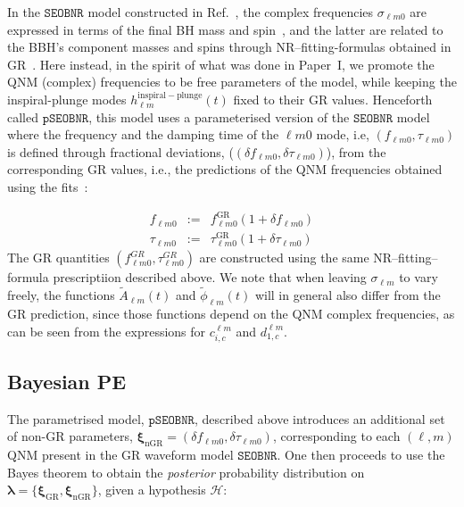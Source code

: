 \documentclass[twocolumn,prd,superscriptaddress,amsfonts,amssymb,amsmath,preprintnumbers]{revtex4-1}
\newcommand{\paperone}{Paper~I\xspace}
\newcommand{\blambda}{\bm{\lambda}}
\newcommand{\bxigr}{\bm{\xi}_{\text{GR}}}
\newcommand{\bxingr}{\bm{\xi}_{\text{nGR}}}
\newcommand{\pSEOB}{\texttt{pSEOBNR}}
\newcommand{\SEOB}{\texttt{SEOBNR}}
\begin{document}
In the $\SEOB$ model constructed in Ref.~\cite{Cotesta:2018fcv}, the complex frequencies $\sigma_{\ell m 0}$  are expressed in terms of the final BH mass and spin~\cite{Berti:2005ys,Berti:2009kk}, and the latter are related to the BBH's component masses and spins through NR--fitting-formulas obtained in GR~\cite{Taracchini:2013rva,Hofmann:2016yih}. Here instead, in the spirit of what was done in \paperone, we promote the QNM (complex) frequencies to be free parameters of the model, while keeping the inspiral-plunge modes $h_{\ell m}^\mathrm{inspiral-plunge}(t)$ fixed to their GR values. Henceforth called $\pSEOB$, this model uses a parameterised version of the $\SEOB$ model where the frequency and the damping time of the ${\ell m 0}$ mode, i.e, $(f_{\ell m 0}, \tau _{\ell m 0})$ is defined through fractional deviations, ($(\delta f_{\ell m 0},\delta \tau_{\ell m 0})$), from the corresponding GR values, i.e., the predictions of the QNM frequencies obtained using the fits~\cite{Taracchini:2013rva,Hofmann:2016yih}:

\begin{eqnarray}
f_{\ell m 0} &:=& f_{\ell m 0}^{\text{GR}} (1 + \delta f_{\ell m 0})\label{eq:nongr_freqs_a} \\ 
\tau _{\ell m 0} &:=& \tau _{\ell m 0}^{\text{GR}} (1 + \delta \tau_{\ell m 0}) \label{eq:nongr_freqs_b}
\end{eqnarray}
The GR quantities $( f_{\ell m 0}^{GR},\tau_{\ell m 0}^{GR})$ are constructed using the same NR--fitting--formula prescriptiion described above. We note that when leaving $\sigma_{\ell m}$ to vary freely, the functions $\tilde{A}_{\ell m}(t)$ and $\tilde{\phi}_{\ell m}(t)$ will in general also differ from the GR prediction, since those functions depend on the QNM complex frequencies, as can be seen from the expressions for $c_{i,c}^{\ell m}$ and $d_{1,c}^{\ell m}$.


\subsection{Bayesian PE}\label{sec:method}

The parametrised model, $\pSEOB$, described above introduces an additional set of non-GR parameters, $\bxingr = (\delta f_{\ell m 0},\delta \tau_{\ell m 0})$, corresponding to each $(\ell,m)$ QNM present in the GR waveform model $\SEOB$. One then proceeds to use the Bayes theorem to obtain the \emph{posterior} probability distribution on $\blambda = \{\bxigr, \bxingr\}$, given a hypothesis $\mathcal{H}$:
\end{document}
